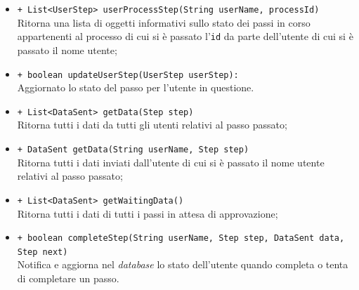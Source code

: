 \begin{flushleft}
\begin{itemize}
\begin{sloppypar}
\begin{itemize}
\item \texttt{+ List<UserStep> userProcessStep(String userName, processId)}\\ Ritorna una lista di oggetti informativi sullo stato dei passi in corso appartenenti al processo di cui si è passato l'\texttt{id} da parte dell'utente di cui si è passato il nome utente;
\item \texttt{+ boolean updateUserStep(UserStep userStep):}\\ Aggiornato lo stato del passo per l'utente in questione.
\item \texttt{+ List<DataSent> getData(Step step)}\\ Ritorna tutti i dati da tutti gli utenti relativi al passo passato;
\item \texttt{+ DataSent getData(String userName, Step step)}\\ Ritorna tutti i dati inviati dall'utente di cui si è passato il nome utente relativi al passo passato;
\item \texttt{+ List<DataSent> getWaitingData()}\\ Ritorna tutti i dati di tutti i passi in attesa di approvazione;
\item \texttt{+ boolean completeStep(String userName, Step step, DataSent data, Step next)}\\Notifica e aggiorna nel \textit{database} lo stato dell'utente quando completa o tenta di completare un passo.
\end{itemize}
\end{sloppypar}
\end{itemize}
\end{flushleft}

